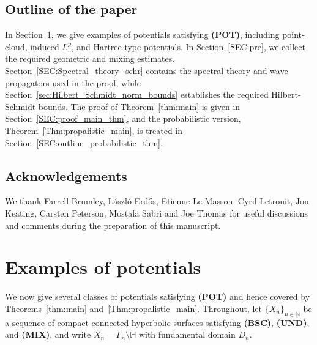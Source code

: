 \documentclass[11pt,twoside,reqno]{amsart}
\newcommand{\N}{\mathbb{N}}
\newcommand{\1}{\mathrm{\mathbf{1}}}
\numberwithin{equation}{section}
\theoremstyle{plain}
\theoremstyle{definition}
\theoremstyle{remark}
\begin{document}

\subsection{Outline of the paper}

In Section~\ref{SEC:potential}, we give examples of potentials satisfying
\textbf{(POT)}, including point-cloud, induced $L^p$, and Hartree-type
potentials. In Section~\ref{SEC:pre}, we collect the required geometric and
mixing estimates. Section~\ref{SEC:Spectral_theory_schr} contains the spectral
theory and wave propagators used in the proof, while
Section~\ref{sec:Hilbert_Schmidt_norm_bounds} establishes the required
Hilbert-Schmidt bounds. The proof of Theorem~\ref{thm:main} is given in
Section~\ref{SEC:proof_main_thm}, and the probabilistic version,
Theorem~\ref{Thm:propalistic_main}, is treated in
Section~\ref{SEC:outline_probabilistic_thm}. 

\subsection*{Acknowledgements} We thank Farrell Brumley, L\'aszl\'o Erd\H{o}s, Etienne Le Masson, Cyril Letrouit, Jon Keating, Carsten Peterson, Mostafa Sabri and Joe Thomas for useful discussions and comments during the preparation of this manuscript.


\section{Examples of potentials}
\label{SEC:potential}

We now give several classes of potentials satisfying \textbf{(POT)} and hence
covered by Theorems~\ref{thm:main} and~\ref{Thm:propalistic_main}. Throughout,
let $\{X_n\}_{n\in\N}$ be a sequence of compact connected hyperbolic surfaces
satisfying \textbf{(BSC)}, \textbf{(UND)}, and \textbf{(MIX)}, and write
$X_n=\Gamma_n\setminus\mathbb H$ with fundamental domain $D_n$.
\end{document}
